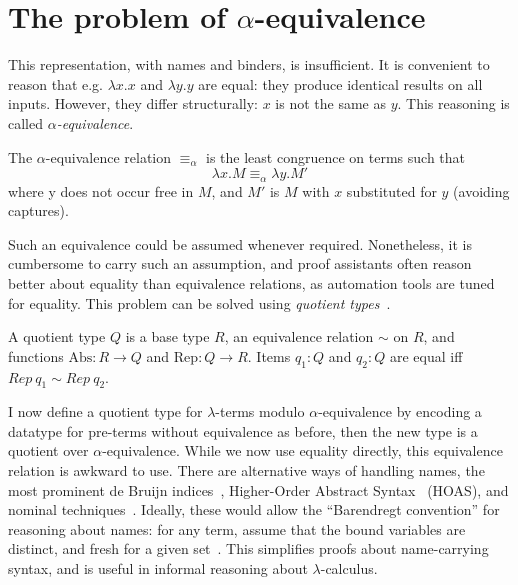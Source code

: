 \section{The problem of \(\alpha\)-equivalence}
\label{sec:alpha-equivalence}
This representation, with names and binders, is insufficient.
It is convenient to reason that e.g. \(\lambda x.x\) and \(\lambda y.y\) are equal: they produce identical results on all inputs.
However, they differ structurally: \(x\) is not the same as \(y\).
This reasoning is called \emph{\(\alpha\)-equivalence}.

\begin{definition}
The \(\alpha\)-equivalence relation \(\equiv_\alpha\) is the least congruence on terms such that
\[
\lambda x.M \equiv_\alpha \lambda y.M'
\]
where y does not occur free in \(M\), and \(M'\) is \(M\) with \(x\) substituted for \(y\) (avoiding captures).
\end{definition}

Such an equivalence could be assumed whenever required.
Nonetheless, it is cumbersome to carry such an assumption, and proof assistants often reason better about equality than equivalence relations, as automation tools are tuned for equality.
This problem can be solved using \emph{quotient types}~\cite{quotient}.

\begin{definition}
A quotient type \(Q\) is a base type \(R\), an equivalence relation \(\sim\) on \(R\), and functions \(\mathrm{Abs} : R \to Q\) and \(\mathrm{Rep} : Q \to R\).
Items \(q_1 : Q\) and \(q_2 : Q\) are equal iff \(Rep\ q_1 \sim Rep\ q_2\).
\end{definition}

I now define a quotient type for \(\lambda\)-terms modulo \(\alpha\)-equivalence by encoding a datatype for pre-terms without equivalence as before, then the new type is a quotient over \(\alpha\)-equivalence.
While we now use equality directly, this equivalence relation is awkward to use.
There are alternative ways of handling names, the most prominent de Bruijn indices~\cite{deBruijn}, Higher-Order Abstract Syntax~\cite{HOAS} (HOAS), and nominal techniques~\cite{nominal}.
Ideally, these would allow the ``Barendregt convention'' for reasoning about names: for any term, assume that the bound variables are distinct, and fresh for a given set~\cite{lambda-overview}.
This simplifies proofs about name-carrying syntax, and is useful in informal reasoning about \(\lambda\)-calculus.

